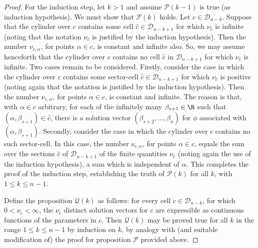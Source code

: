 \documentclass{article}
\begin{document}
\begin{proof}
    For the induction step, let $k > 1$ and assume $\mathcal{P}(k-1)$ is true
    (as induction hypothesis). We must show that $\mathcal{P}(k)$ holds.
    Let $c \in \mathcal{D}_{n-k}$.
    Suppose that the cylinder over $c$ contains some 
    cell $\hat{c} \in \mathcal{D}_{n-k+1}$ for which $\nu_{\hat{c}}$
    is infinite (noting that the notation $\nu_{\hat{c}}$
    is justified by the induction hypothesis).
    Then the number $\nu_{c, \alpha}$, for points $\alpha \in c$,
    is constant and infinite also.
    So, we may assume henceforth that the cylinder over $c$ contains
    no cell $\hat{c}$ in $\mathcal{D}_{n-k+1}$ for which $\nu_{\hat{c}}$
    is infinite. Two cases remain to be considered.
    Firstly, consider the case in which the cylinder over $c$
    contains some sector-cell $\hat{c} \in \mathcal{D}_{n-k+1}$
    for which $\nu_{\hat{c}}$ is positive
    (noting again that the notation is justified by the induction
    hypothesis). Then the number $\nu_{c, \alpha}$, for points
    $\alpha \in c$, is constant and infinite. The reason is that,
    with $\alpha \in c$ arbitrary,
    for each of the infinitely many $\beta_{s+1} \in \R$
    such that $(\alpha, \beta_{s+1}) \in \hat{c}$,
    there is a solution vector $(\beta_{s+2}, \ldots, \beta_n)$
    for $\phi$ associated with $(\alpha, \beta_{s+1})$.
    Secondly, consider the case in which the cylinder over $c$
    contains no such sector-cell. In this case, the number
    $\nu_{c, \alpha}$, for points $\alpha \in c$, equals the sum 
    over the sections $\hat{c}$ of $\mathcal{D}_{n-k+1}$
    of the finite quantities $\nu_{\hat{c}}$ (noting again the use of the
    induction hypothesis), a sum which is independent of $\alpha$.
    This completes the proof of the induction step,
    establishing the truth of $\mathcal{P}(k)$ for all $k$, with $1 \le k \le n-1$.

    Define the proposition $\mathcal{Q}(k)$ as follows:
    for every cell $c \in \mathcal{D}_{n-k}$,
    for which $0 < \nu_c < \infty$,
    the $\nu_c$ distinct solution vectors for $c$ are expressible
    as continuous functions of the parameters in $c$.
    Then $\mathcal{Q}(k)$ may be proved true for all $k$ in the range 
    $1 \le k \le n-1$ by induction on $k$,
    by analogy with (and suitable modification of)
    the proof for proposition $\mathcal{P}$ provided above.
    
\end{proof}
\end{document}
